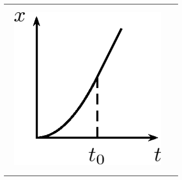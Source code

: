 \begin{enumerate}[noitemsep, label=\textbf{\arabic*}. ]
\begin{center}
\begin{xtabular*}{\mytablewidth}[t]{|p{10\mystarwidth}|p{10\mystarwidth}|p{10\mystarwidth}|p{10\mystarwidth}|}
\begin{center}
      \vspace{2pt}
    \vspace{.1in}
    
    \end{center}



    \addtocounter{footnote}{-0}
     &
    
    
        
    \setcounter{subfigure}{0}

\label{m38796*id81664}
    \begin{center}
    \label{m38796*id81664!!!underscore!!!media}\label{m38796*id81664!!!underscore!!!printimage}\includegraphics[width=300px]{col11305.imgs/m38796_PG10C2_048.png} %
        
      \vspace{2pt}
    \vspace{.1in}
    
    \end{center}



    \addtocounter{footnote}{-0}
     &
    
    
        
    \setcounter{subfigure}{0}


\end{xtabular*}
\end{center}
\end{enumerate}
